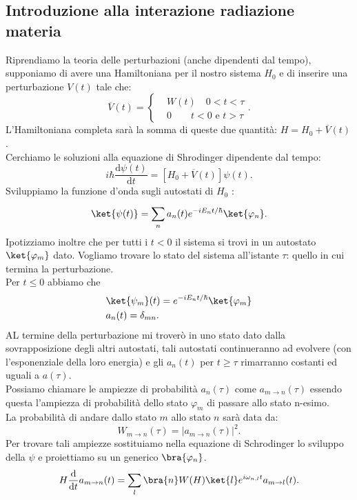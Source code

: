 \subsection{Introduzione alla interazione radiazione materia}%
\label{sub:Introduzione alla interazione radiazione materia}
Riprendiamo la teoria delle perturbazioni (anche dipendenti dal tempo), supponiamo di avere una Hamiltoniana per il nostro sistema $H_0$ e di inserire una perturbazione $V(t) $ tale che:
\[
    \overline{V}(t) = \begin{cases}
	&W(t)  \quad  0<t<\tau\\
	&0 	\quad \quad t<0 \text{ e } t>\tau
    \end{cases}
.\] 
L'Hamiltoniana completa sarà la somma di queste due quantità: $H=H_0+\overline{V}(t)$.\\
Cerchiamo le soluzioni alla equazione di Shrodinger dipendente dal tempo:
\[
    i\hbar \frac{\text{d} \psi(t)}{\text{d} t} 
    = \left[H_0+\overline{V}(t) \right]\psi (t) 
.\] 
Sviluppiamo la funzione d'onda sugli autostati di $H_0$ :
\[
    \ket{\psi(t)}=\sum_{n}^{} a_n(t) e^{-i E_n t /\hbar }\ket{\varphi_n}
.\] 
Ipotizziamo inoltre che per tutti i $t<0$ il sistema si trovi in un autostato $\ket{\varphi_m}$ dato. Vogliamo trovare lo stato del sistema all'istante $ \tau$: quello in cui termina la perturbazione.\\
Per $t\le 0$ abbiamo che 
\[\begin{aligned}
    &\ket{\psi_m}(t) = e^{-iE_n t /\hbar } \ket{\varphi_m}\\
    &a_n(t) = \delta_{mn}
.\end{aligned}\]
AL termine della perturbazione mi troverò in uno stato dato dalla sovrapposizione degli altri autostati, tali autostati continueranno ad evolvere (con l'esponenziale della loro energia) e gli $a_n(t)$ per $t\ge \tau$ rimarranno costanti ed uguali a $a(\tau)$.\\
Possiamo chiamare le ampiezze di probabilità $a_n(\tau)$ come $a_{m\to n}(\tau) $ essendo questa l'ampiezza di probabilità dello stato $\varphi_m$ di passare allo stato n-esimo.\\
La probabilità di andare dallo stato $m$ allo stato $n$ sarà data da:
\[
    W_{m\to n}(\tau)=\left|a_{m\to n}(\tau) \right|^2
.\] 
Per trovare tali ampiezze sostituiamo nella equazione di Schrodinger lo sviluppo della $\psi$ e proiettiamo su un generico $\bra{\varphi_n}$.\\
\[
    H\frac{\text{d} }{\text{d} t} a_{m\to n}(t) 
    = \sum_{l}^{} \bra{n}W(H)\ket{l}e^{i\omega_{n,l} t}a_{m\to l}(t) 
.\] 
